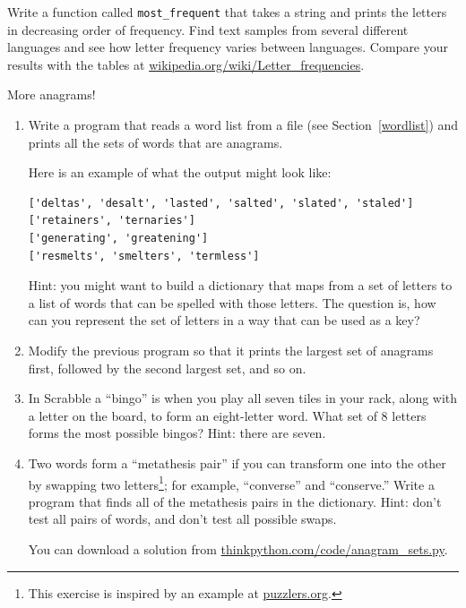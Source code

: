 \documentclass[10pt]{book}
\begin{document}
\begin{ex}
Write a function called \verb"most_frequent" that takes a string and
prints the letters in decreasing order of frequency.  Find text
samples from several different languages and see how letter frequency
varies between languages.  Compare your results with the tables at
\url{wikipedia.org/wiki/Letter_frequencies}.


\end{ex}


\begin{ex}
\label{anagrams}


More anagrams!

\begin{enumerate}

\item Write a program
that reads a word list from a file (see Section~\ref{wordlist}) and
prints all the sets of words that are anagrams.

Here is an example of what the output might look like:

\beforeverb
\begin{verbatim}
['deltas', 'desalt', 'lasted', 'salted', 'slated', 'staled']
['retainers', 'ternaries']
['generating', 'greatening']
['resmelts', 'smelters', 'termless']
\end{verbatim}
\afterverb
%
Hint: you might want to build a dictionary that maps from a
set of letters to a list of words that can be spelled with those
letters.  The question is, how can you represent the set of
letters in a way that can be used as a key?

\item Modify the previous program so that it prints the largest set
of anagrams first, followed by the second largest set, and so on.


\item In Scrabble a ``bingo'' is when you play all seven tiles in
your rack, along with a letter on the board, to form an eight-letter
word.  What set of 8 letters forms the most possible bingos?
Hint: there are seven.



\item Two words form a ``metathesis pair'' if you can transform one
  into the other by swapping two letters\footnote{This exercise is
    inspired by an example at \url{puzzlers.org}.}; for example,
  ``converse'' and ``conserve.''  Write a program that finds all of
  the metathesis pairs in the dictionary.  Hint: don't test all pairs
  of words, and don't test all possible swaps.

You can download a solution from \url{thinkpython.com/code/anagram_sets.py}.

\end{enumerate}
\end{ex}
\end{document}
